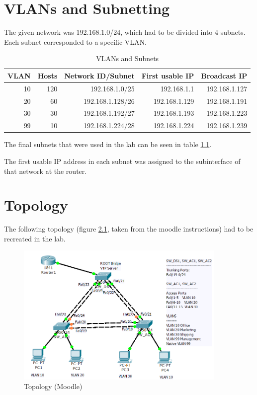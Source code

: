 \chapter{VLANs and Subnetting}

\thispagestyle{standard}
\pagestyle{standard}

The given network was 192.168.1.0/24, which had to be divided into 4 subnets. Each subnet corresponded to a specific \ac{VLAN}.

\begin{table}[h]
\centering
\begin{tabular}{r||r|r|r|r|}
\textbf{VLAN} & \textbf{Hosts} & \textbf{Network ID/Subnet} & \textbf{First usable IP} & \textbf{Broadcast IP} \\

		\hline
10 & 120 & 192.168.1.0/25 & 192.168.1.1 & 192.168.1.127  \\
20 & 60 & 192.168.1.128/26 & 192.168.1.129 & 192.168.1.191  \\
30 & 30 & 192.168.1.192/27 & 192.168.1.193 & 192.168.1.223  \\
99 & 10 & 192.168.1.224/28 & 192.168.1.224 & 192.168.1.239  \\

\end{tabular}
\caption{VLANs and Subnets}
\label{tab:vlan_subnets}
\end{table}

The final subnets that were used in the lab can be seen in table  \ref{tab:vlan_subnets}.

The first usable IP address in each subnet was assigned to the subinterface of that network at the router.

\chapter{Topology}

The following topology (figure \ref{img:topo}, taken from the moodle instructions) had to be recreated in the lab.

\begin{figure}[H]
	\centering
	\includegraphics[width=0.9\textwidth]{img/topo.png}
	\caption{Topology (Moodle)}
	\label{img:topo}
\end{figure}

